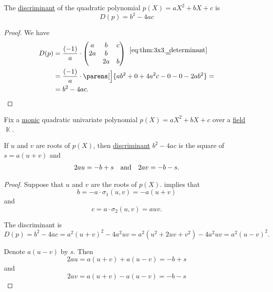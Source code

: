 \begin{lemma}\label{thm:quadratic_polynomial_discriminant}
  The \hyperref[def:discriminant]{discriminant} of the quadratic polynomial \( p(X) = a X^2 + b X + c \) is
  \begin{equation}\label{eq:thm:quadratic_polynomial_discriminant}
    D(p) = b^2 - 4ac
  \end{equation}
\end{lemma}
\begin{proof}
  We have
  \begin{align*}
    D(p)
    &=
    \frac {(-1)} a \cdot \begin{pmatrix}
      a  & b  & c  \\
      2a & b  &    \\
         & 2a & b
    \end{pmatrix}
    \reloset {\eqref{eq:thm:3x3_determinant}} = \\ &=
    \frac {(-1)} a \cdot \parens[\Big]{ ab^2 + 0 + 4a^2c - 0 - 0 - 2ab^2 }
    = \\ &=
    b^2 - 4ac.
  \end{align*}
\end{proof}

\begin{proposition}\label{thm:quadratic_polynomial_roots}
  Fix a \hyperref[def:monic_polynomial]{monic} quadratic univariate polynomial \( p(X) = aX^2 + b X + c \) over a \hyperref[def:field]{field} \( \BbbK \).

  If \( u \) and \( v \) are roots of \( p(X) \), then \hyperref[def:discriminant]{discriminant} \( b^2 - 4ac \) is the square of \( s = a(u + v) \) and
  \begin{align*}
    2au = -b + s
    &&\T{and}&&
    2av = -b - s.
  \end{align*}
\end{proposition}
\begin{proof}
  Suppose that \( u \) and \( v \) are the roots of \( p(X) \).  implies that
  \begin{equation*}
    b =  -a \cdot \sigma_1(u, v) = -a(u + v)
  \end{equation*}
  and
  \begin{equation*}
    c = a \cdot \sigma_2(u, v) = auv.
  \end{equation*}

  The discriminant is
  \begin{equation*}
    D(p) = b^2 - 4ac = a^2(u + v)^2 - 4a^2 uv = a^2 (u^2 + 2uv + v^2) - 4a^2 uv = a^2 (u - v)^2.
  \end{equation*}

  Denote \( a(u - v) \) by \( s \). Then
  \begin{equation*}
    2au = a(u + v) + a(u - v) = -b + s
  \end{equation*}
  and
  \begin{equation*}
    2av = a(u + v) - a(u - v) = -b - s
  \end{equation*}
\end{proof}

